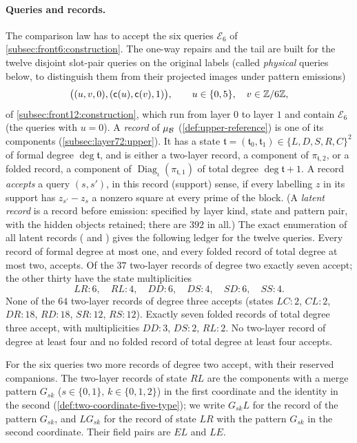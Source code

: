\paragraph{Queries and records.}
The comparison law has to accept the six queries $\mathcal E_6$ of
\cref{subsec:front6:construction}. The one-way repairs and the tail are built
for the twelve disjoint slot-pair queries on the original
labels (called \emph{physical} queries below, to distinguish
them from their projected images under pattern emissions)
\begin{equation}\label{eq:upper-twelve}
 \bigl((u,v,0),(\mathsf c(u),\mathsf c(v),1)\bigr),\qquad u\in\{0,5\},\quad v\in\mathbb Z/6\mathbb Z,
\end{equation}
of \cref{subsec:front12:construction}, which run from layer $0$ to layer
$1$ and contain $\mathcal E_6$ (the queries with $u=0$). A \emph{record} of
$\mu_\mathcal B$ (\cref{def:upper-reference}) is one of its components
(\cref{subsec:layer72:upper}). It has a state
$\mathfrak t=(\mathfrak t_0,\mathfrak t_1)\in\{L,D,S,R,C\}^2$ of formal
degree $\deg\mathfrak t$, and is either a two-layer record, a component
of $\pi_{\mathfrak t,2}$, or a folded record, a component of
$\operatorname{Diag}_\iota(\pi_{\mathfrak t,1})$ of total degree
$\deg\mathfrak t+1$. A record \emph{accepts} a query $(s,s')$, in this
record (support) sense, if every
labelling $z$ in its support has $z_{s'}-z_s$ a nonzero square at every
prime of the block. (A \emph{latent record} is a record before
emission: specified by layer kind, state and pattern pair, with
the hidden objects retained; there are $392$ in all.) The exact
enumeration of all latent records
( and
) gives the following ledger for the
twelve queries. Every record of formal degree at most one, and every folded
record of total degree at most two, accepts. Of the $37$ two-layer records of
degree two exactly seven accept; the other thirty have the state multiplicities
\[
 LR\colon6,\quad RL\colon4,\quad DD\colon6,\quad DS\colon4,\quad
 SD\colon6,\quad SS\colon4 .
\]
None of the $64$ two-layer records of degree three accepts (states
$LC\colon2$, $CL\colon2$, $DR\colon18$, $RD\colon18$, $SR\colon12$,
$RS\colon12$). Exactly seven folded records of total degree three accept,
with multiplicities $DD\colon3$, $DS\colon2$, $RL\colon2$. No two-layer
record of degree at least four and no folded record of total degree at least
four accepts.

For the six queries two more records of degree two accept, with their reserved
companions. The two-layer records of state $RL$ are the components with a merge
pattern $G_{sk}$ ($s\in\{0,1\}$, $k\in\{0,1,2\}$) in the first coordinate and the
identity in the second (\cref{def:two-coordinate-five-type}); we write $G_{sk}L$
for the record of the pattern $G_{sk}$, and $LG_{sk}$ for the record of state
$LR$ with the pattern $G_{sk}$ in the second coordinate. Their field pairs are
$EL$ and $LE$.

